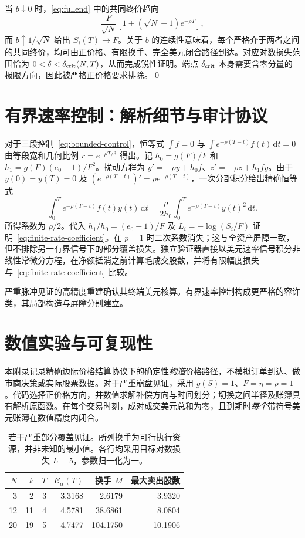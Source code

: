 \documentclass[11pt]{article}
\numberwithin{equation}{section}
\theoremstyle{definition}
\theoremstyle{remark}
\newcommand{\dd}{\,\mathrm{d}}
\begin{document}
当 $b\downarrow0$ 时，\eqref{eq:fullend} 中的共同终价趋向
\[
\frac{F}{\sqrt N}\left[1+(\sqrt N-1)e^{-\rho T}\right],
\]
而 $b\uparrow1/\sqrt N$ 给出 $S_i(T)\to F$。关于 $b$ 的连续性意味着，每个严格介于两者之间的共同终价，均可由正价格、有限换手、完全美元闭合路径到达。对应对数损失范围恰为 $0<\delta<\delta_{\rm crit}(N,T)$，从而完成锐性证明。端点 $\delta_{\rm crit}$ 本身需要含零分量的极限方向，因此被严格正价格要求排除。\qed

\section{有界速率控制：解析细节与审计协议}\label{app:rate}
对于三段控制~\eqref{eq:bounded-control}，恒等式 $\int f=0$ 与 $\int e^{-\rho(T-t)}f(t)\dd t=0$ 由等段宽和几何比例 $r=e^{-\rho T/3}$ 得出。记 $h_0=g(F)/F$ 和 $h_1=g(F)(e_0-1)/F^2$。扰动方程为 $y'=-\rho y+h_0 f$、$z'=-\rho z+h_1fy$。由于 $y(0)=y(T)=0$ 及 $(e^{-\rho(T-t)})'=\rho e^{-\rho(T-t)}$，一次分部积分给出精确恒等式
\begin{equation}\label{eq:ibp}
\int_0^T e^{-\rho(T-t)}f(t)y(t)\dd t
=\frac{\rho}{2h_0}\int_0^T e^{-\rho(T-t)}y(t)^2\dd t.
\end{equation}
所得系数为 $\rho/2$。代入 $h_1/h_0=(e_0-1)/F$ 及 $L_i=-\log(S_i/F)$ 证明~\eqref{eq:finite-rate-coefficient}。在 $p=1$ 时二次系数消失；这与全资产屏障一致，但不排除另一有界信号下的部分覆盖损失。独立验证器直接以美元速率信号积分非线性常微分方程，在净额抵消之前计算毛成交股数，并将有限幅度损失与~\eqref{eq:finite-rate-coefficient} 比较。

严重脉冲见证的高精度重建确认其终端美元核算。有界速率控制构成更严格的容许类，其局部构造与屏障分别建立。

\section{数值实验与可复现性}\label{app:numerics}
本附录记录精确边际价格结算协议下的确定性\emph{构造}价格路径，不模拟订单到达、做市商决策或实际股票数据。对于严重崩盘见证，采用 $g(S)=1$、$F=\eta=\rho=1$。代码选择正价格方向，并数值求解补偿方向与时间划分；切换之间半径及账簿具有解析原函数。在每个交易时刻，成对成交美元总和为零，且到期时\emph{每个}带符号美元账簿在数值精度内闭合。

\begin{table}[H]\centering\small
\caption{若干严重部分覆盖见证。所列换手为可行执行资源，并非未知的最小值。各行均采用目标对数损失 $L=5$，参数归一化为一。}\label{tab:witness}
\begin{tabular}{@{}rrrrrr@{}}\toprule
$N$ & $k$ & $T$ & $\mathcal C_\alpha(T)$ & 换手 $M$ & 最大卖出股数 \\\midrule
3 & 2 & 3 & 3.3168 & 2.6179 & 3.9320\\
12 & 11 & 4 & 4.5781 & 38.6861 & 8.0804\\
20 & 19 & 5 & 4.7477 & 104.1750 & 10.1906\\
\bottomrule\end{tabular}
\end{table}
\end{document}
